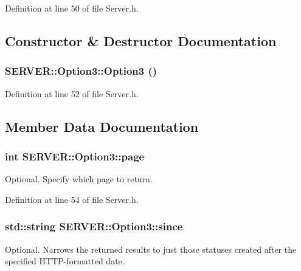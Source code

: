 Definition at line 50 of file Server.h.

\subsection{Constructor \& Destructor Documentation}
\hypertarget{structSERVER_1_1Option3_aa0c40ea1bb475515e5e810c05ce4dca}{
\subsubsection{\setlength{\rightskip}{0pt plus 5cm}SERVER::Option3::Option3 ()}}
\label{structSERVER_1_1Option3_aa0c40ea1bb475515e5e810c05ce4dca}




Definition at line 52 of file Server.h.

\subsection{Member Data Documentation}
\hypertarget{structSERVER_1_1Option3_94f1d27b09f86c44d18275a3c3f2697d}{
\subsubsection{\setlength{\rightskip}{0pt plus 5cm}int {\bf SERVER::Option3::page}}}
\label{structSERVER_1_1Option3_94f1d27b09f86c44d18275a3c3f2697d}


Optional. Specify which page to return. 



Definition at line 54 of file Server.h.\hypertarget{structSERVER_1_1Option3_f2d56b690d7b755c4ca88869dfcf9ff6}{
\subsubsection{\setlength{\rightskip}{0pt plus 5cm}std::string {\bf SERVER::Option3::since}}}
\label{structSERVER_1_1Option3_f2d56b690d7b755c4ca88869dfcf9ff6}


Optional. Narrows the returned results to just those statuses created after the specified HTTP-formatted date. 




